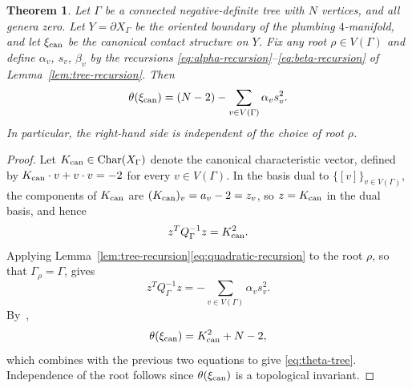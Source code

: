 \documentclass[11pt]{amsart}
\theoremstyle{plain}
\newtheorem{theorem}{Theorem}[section]
\theoremstyle{definition}
\theoremstyle{remark}
\begin{document}
\begin{theorem}\label{thm:tree-general}
Let $\Gamma$ be a connected negative-definite tree with $N$ vertices,
and all genera zero. Let $Y=\partial X_\Gamma$ be the oriented
boundary of the plumbing $4$-manifold, and let $\xi_{\rm can}$ be the
canonical contact structure on $Y$. Fix any root $\rho\in V(\Gamma)$
and define $\alpha_v$, $s_v$, $\beta_v$ by the recursions
\eqref{eq:alpha-recursion}--\eqref{eq:beta-recursion} of
Lemma~\ref{lem:tree-recursion}. Then
\begin{equation}\label{eq:theta-tree}
\theta(\xi_{\rm can})
=
(N-2)
-\sum_{v\in V(\Gamma)}\alpha_v s_v^2.
\end{equation}
In particular, the right-hand side is independent of the choice of
root $\rho$.
\end{theorem}

\begin{proof}
Let $K_{\rm can}\in\operatorname{Char}(X_\Gamma)$ denote the canonical
characteristic vector, defined by $K_{\rm can}\cdot v+v\cdot v=-2$
for every $v\in V(\Gamma)$. In the basis dual to $\{[v]\}_{v\in V(\Gamma)}$,
the components of $K_{\rm can}$ are
$(K_{\rm can})_v=a_v-2=z_v$, so $z=K_{\rm can}$ in the dual basis,
and hence
\[
z^T Q_\Gamma^{-1}z=K_{\rm can}^2.
\]
Applying Lemma~\ref{lem:tree-recursion}\eqref{eq:quadratic-recursion}
to the root $\rho$, so that $\Gamma_\rho=\Gamma$, gives
\[
z^T Q_\Gamma^{-1}z=-\sum_{v\in V(\Gamma)}\alpha_v s_v^2.
\]
By~\cite[Remark~4.8]{NemethiNicolaescu2002},
\[
\theta(\xi_{\rm can})=K_{\rm can}^2+N-2,
\]
which combines with the previous two equations to give
\eqref{eq:theta-tree}. Independence of the root follows since
$\theta(\xi_{\rm can})$ is a topological invariant.
\end{proof}
\end{document}
